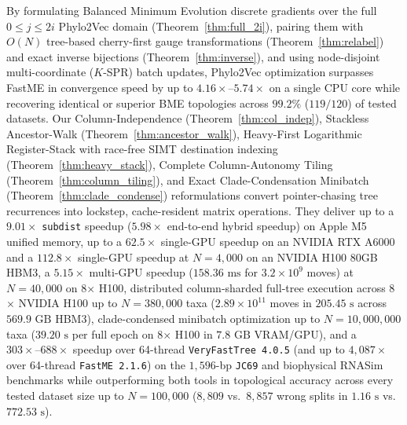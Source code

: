 \documentclass[11pt,a4paper]{article}
\makeatletter
\DeclareRobustCommand{\_}{\ifmmode\nfss@text{\textunderscore}\else\textunderscore\allowbreak\fi}
\theoremstyle{definition}
\makeatother
\begin{document}
By formulating Balanced Minimum Evolution discrete gradients over the full $0 \le j \le 2i$ Phylo2Vec domain (Theorem~\ref{thm:full_2i}), pairing them with $O(N)$ tree-based cherry-first gauge transformations (Theorem~\ref{thm:relabel}) and exact inverse bijections (Theorem~\ref{thm:inverse}), and using node-disjoint multi-coordinate ($K$-SPR) batch updates, Phylo2Vec optimization surpasses FastME in convergence speed by up to $4.16\times\text{--}5.74\times$ on a single CPU core while recovering identical or superior BME topologies across $99.2\%$ ($119/120$) of tested datasets. Our Column-Independence (Theorem~\ref{thm:col_indep}), Stackless Ancestor-Walk (Theorem~\ref{thm:ancestor_walk}), Heavy-First Logarithmic Register-Stack with race-free SIMT destination indexing (Theorem~\ref{thm:heavy_stack}), Complete Column-Autonomy Tiling (Theorem~\ref{thm:column_tiling}), and Exact Clade-Condensation Minibatch (Theorem~\ref{thm:clade_condense}) reformulations convert pointer-chasing tree recurrences into lockstep, cache-resident matrix operations. They deliver up to a $9.01\times$ \texttt{subdist} speedup ($5.98\times$ end-to-end hybrid speedup) on Apple M5 unified memory, up to a $62.5\times$ single-GPU speedup on an NVIDIA RTX A6000 and a $112.8\times$ single-GPU speedup at $N = 4{,}000$ on an NVIDIA H100 80GB HBM3, a $5.15\times$ multi-GPU speedup ($158.36\text{ ms}$ for $3.2 \times 10^9$ moves) at $N = 40{,}000$ on 8$\times$ H100, distributed column-sharded full-tree execution across 8$\times$ NVIDIA H100 up to $N = 380{,}000$ taxa ($2.89 \times 10^{11}$ moves in $205.45\text{ s}$ across $569.9\text{ GB}$ HBM3), clade-condensed minibatch optimization up to $N = 10{,}000{,}000$ taxa ($39.20\text{ s}$ per full epoch on 8$\times$ H100 in $7.8\text{ GB}$ VRAM/GPU), and a $303\times\text{--}688\times$ speedup over 64-thread \texttt{VeryFastTree 4.0.5} (and up to $4{,}087\times$ over 64-thread \texttt{FastME 2.1.6}) on the $1{,}596$-bp \texttt{JC69} and biophysical RNASim benchmarks while outperforming both tools in topological accuracy across every tested dataset size up to $N = 100{,}000$ ($8{,}809$ vs.\ $8{,}857$ wrong splits in $1.16\text{ s}$ vs.\ $772.53\text{ s}$).
\end{document}
